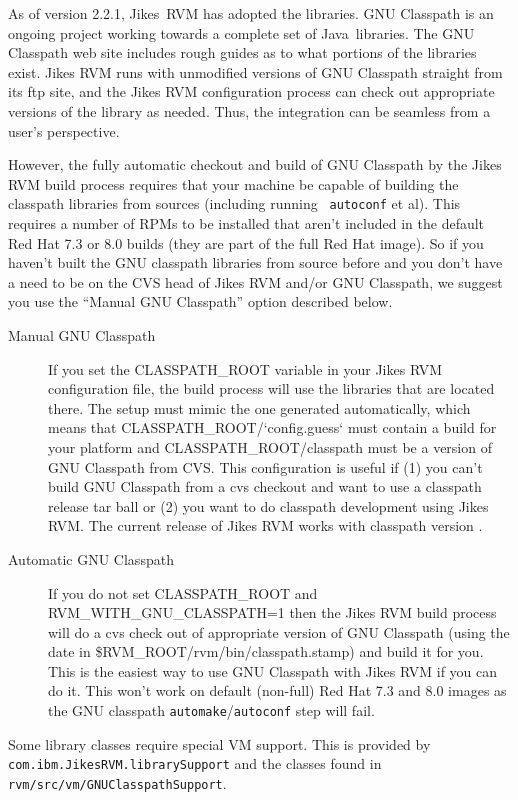  As of version 2.2.1, Jikes\JikesTMFootnote\ RVM has adopted the
 libraries.  GNU
Classpath is an ongoing project working towards a complete set of
Java\JavaTMFootnote\ libraries.  The GNU Classpath web site includes
rough guides as to what portions of the libraries exist.  Jikes RVM
runs with unmodified versions of GNU Classpath straight from its ftp
site, and the Jikes RVM configuration process can check out
appropriate versions of the library as needed.  Thus, the integration
can be seamless from a user's perspective.

However, the fully automatic checkout and build of GNU Classpath by
the Jikes RVM build process requires that your machine be capable of
building the classpath libraries from sources (including running {\tt
autoconf} et al).  This requires a number of RPMs to be installed that
aren't included in the default Red Hat 7.3 or 8.0 builds (they are
part of the full Red Hat image).  So if you haven't built the GNU
classpath libraries from source before and you don't have a need to be
on the CVS head of Jikes RVM and/or GNU Classpath, we suggest you use
the ``Manual GNU Classpath'' option described below.

\begin{description}
\item[Manual GNU Classpath] If you set the CLASSPATH\_ROOT variable in
your Jikes RVM configuration file, the build process will use the
libraries that are located there.  The setup must mimic the one
generated automatically, which means that
CLASSPATH\_ROOT/`config.guess` must contain a build for your platform
and CLASSPATH\_ROOT/classpath must be a version of GNU Classpath from
CVS.  This configuration is useful if (1) you can't build GNU
Classpath from a cvs checkout and want to use a classpath release tar
ball or (2) you want to do classpath development using Jikes RVM. The
current release of Jikes RVM works with classpath version \classpathversion.

\item[Automatic GNU Classpath] If you do not set CLASSPATH\_ROOT and 
RVM\_WITH\_GNU\_CLASSPATH=1 then the Jikes RVM build process will do a
cvs check out of appropriate version of GNU Classpath (using the date
in \$RVM\_ROOT/rvm/bin/classpath.stamp) and build it for you.  This is
the easiest way to use GNU Classpath with Jikes RVM if you can do it.
This won't work on default (non-full) Red Hat 7.3 and 8.0 images
as the GNU classpath {\tt automake}/{\tt autoconf} step will fail.

\end{description}

 Some library classes require special VM support.  This is provided by
{\tt com.ibm.JikesRVM.librarySupport} and the classes found in
{\tt rvm/src/vm/GNUClasspathSupport}. 

\JavaTMFooter
\JikesTMFooter
